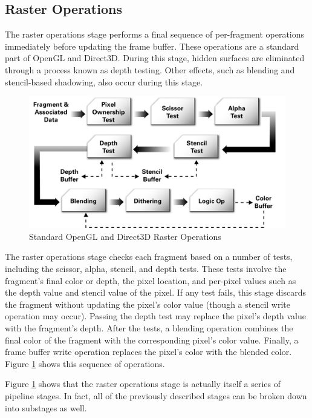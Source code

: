 \documentclass{book}
\begin{document}
\subsection*{Raster Operations}

The raster operations stage performs a final sequence of per-fragment operations immediately before updating the frame buffer. These operations are a standard part of OpenGL and Direct3D. During this stage, hidden surfaces are eliminated through a process known as depth testing. Other effects, such as blending and stencil-based shadowing, also occur during this stage.

\begin{figure}
    \centering
    \includegraphics[width=1\linewidth]{Images/fig1_5.jpg}
    \caption{Standard OpenGL and Direct3D Raster Operations}
    \label{fig:1-5}
\end{figure}

The raster operations stage checks each fragment based on a number of tests, including the scissor, alpha, stencil, and depth tests. These tests involve the fragment's final color or depth, the pixel location, and per-pixel values such as the depth value and stencil value of the pixel. If any test fails, this stage discards the fragment without updating the pixel's color value (though a stencil write operation may occur). Passing the depth test may replace the pixel's depth value with the fragment's depth. After the tests, a blending operation combines the final color of the fragment with the corresponding pixel's color value. Finally, a frame buffer write operation replaces the pixel's color with the blended color. Figure \ref{fig:1-5} shows this sequence of operations.

Figure \ref{fig:1-5} shows that the raster operations stage is actually itself a series of pipeline stages. In fact, all of the previously described stages can be broken down into substages as well.
\end{document}
